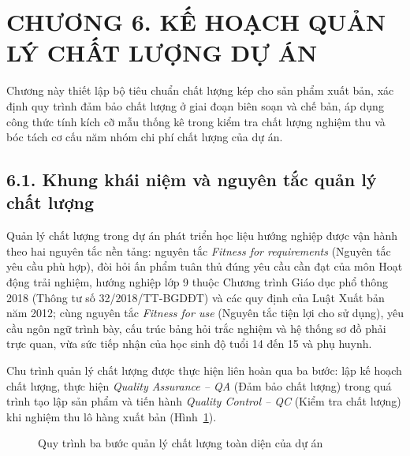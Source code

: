 \section{CHƯƠNG 6. KẾ HOẠCH QUẢN LÝ CHẤT LƯỢNG DỰ ÁN}

Chương này thiết lập bộ tiêu chuẩn chất lượng kép cho sản phẩm xuất bản, xác định quy trình đảm bảo chất lượng ở giai đoạn biên soạn và chế bản, áp dụng công thức tính kích cỡ mẫu thống kê trong kiểm tra chất lượng nghiệm thu và bóc tách cơ cấu năm nhóm chi phí chất lượng của dự án.

\subsection{6.1. Khung khái niệm và nguyên tắc quản lý chất lượng}

Quản lý chất lượng trong dự án phát triển học liệu hướng nghiệp được vận hành theo hai nguyên tắc nền tảng: nguyên tắc \textit{Fitness for requirements} (Nguyên tắc yêu cầu phù hợp), đòi hỏi ấn phẩm tuân thủ đúng yêu cầu cần đạt của môn Hoạt động trải nghiệm, hướng nghiệp lớp 9 thuộc Chương trình Giáo dục phổ thông 2018 (Thông tư số 32/2018/TT-BGDĐT) và các quy định của Luật Xuất bản năm 2012; cùng nguyên tắc \textit{Fitness for use} (Nguyên tắc tiện lợi cho sử dụng), yêu cầu ngôn ngữ trình bày, cấu trúc bảng hỏi trắc nghiệm và hệ thống sơ đồ phải trực quan, vừa sức tiếp nhận của học sinh độ tuổi 14 đến 15 và phụ huynh.

Chu trình quản lý chất lượng được thực hiện liên hoàn qua ba bước: lập kế hoạch chất lượng, thực hiện \textit{Quality Assurance -- QA} (Đảm bảo chất lượng) trong quá trình tạo lập sản phẩm và tiến hành \textit{Quality Control -- QC} (Kiểm tra chất lượng) khi nghiệm thu lô hàng xuất bản (Hình~\ref{fig:quy_trinh_chat_luong}).

\begin{figure}[htbp]
\centering
{}
\caption{Quy trình ba bước quản lý chất lượng toàn diện của dự án}
\label{fig:quy_trinh_chat_luong}
\end{figure}

